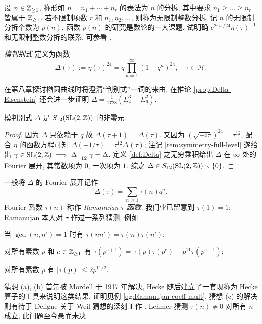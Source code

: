 \begin{exercise}
	设 $n \in \mathbb{Z}_{\geq 1}$, 称形如 $n = n_1 + \cdots + n_r$ 的表法为 $n$ 的分拆, 其中要求 $n_1 \geq \ldots \geq n_r$ 皆属于 $\mathbb{Z}_{\geq 1}$. 若不限制项数 $r$ 和 $n_1, n_2, \ldots$, 则称为无限制整数分拆, 记 $n$ 的无限制分拆个数为 $p(n)$. 函数 $p(n)$ 的研究是数论的一大课题. 试明确 $e^{2\pi i\tau/24} \eta(\tau)^{-1}$ 和无限制整数分拆的联系. 可参看 \cite[附录 A.4]{Ste17}.
\end{exercise}

\begin{definition}\label{def:Delta}  
	\emph{模判别式} 定义为函数
	\[ \Delta(\tau) := \eta(\tau)^{24} = q \prod_{n=1}^\infty (1-q^n)^{24}, \quad \tau \in \mathcal{H}. \]
\end{definition}
在第八章探讨椭圆曲线时将澄清``判别式''一词的来由. 在推论 \ref{prop:Delta-Eisenstein} 还会进一步证明 $\Delta = \frac{1}{1728}(E_4^3 - E_6^2)$.

\begin{proposition}
	模判别式 $\Delta$ 是 $S_{12}(\operatorname{SL}(2,\mathbb{Z}))$ 的非零元.
\end{proposition}
\begin{proof}
	因为 $\Delta$ 只依赖于 $q$ 故 $\Delta(\tau+1)=\Delta(\tau)$. 又因为 $(\sqrt{-i\tau})^{24} = \tau^{12}$, 配合 $\eta$ 的函数方程可知 $\Delta(-1/\tau) = \tau^{12} \Delta(\tau)$; 注记 \ref{rem:symmetry-full-level} 遂给出 $\gamma \in \operatorname{SL}(2,\mathbb{Z}) \implies \Delta \;\big|_{12} \; \gamma =\Delta$. 定义 \ref{def:Delta} 之无穷乘积给出 $\Delta$ 在 $\infty$ 处的 Fourier 展开, 其常数项为 $0$, 一次项为 $1$. 综之 $\Delta \in S_{12}(\operatorname{SL}(2,\mathbb{Z})) \smallsetminus \{0\}$.
\end{proof}

一般将 $\Delta$ 的 Fourier 展开记作  
\[ \Delta(\tau) = \sum_{n \geq 1} \tau(n) q^n .\]
Fourier 系数 $\tau(n)$ 称作 \emph{Ramanujan $\tau$ 函数}. 我们业已留意到 $\tau(1)=1$; Ramanujan 本人对 $\tau$ 作过一系列猜测, 例如
\begin{compactenum}[(a)]
	\item 当 $\gcd(n,n')=1$ 时有 $\tau(nn')=\tau(n)\tau(n')$;
	\item 对所有素数 $p$ 和 $e \in \mathbb{Z}_{\geq 1}$ 有 $\tau(p^{e+1}) = \tau(p)\tau(p^e) - p^{11}\tau(p^{e-1})$;
	\item 对所有素数 $p$ 有 $|\tau(p)| \leq 2p^{11/2}$.
\end{compactenum}
猜想 (a), (b) 首先被 Mordell 于 1917 年解决, Hecke 随后建立了一套现称为 Hecke 算子的工具来说明这类结果, 证明见例 \ref{eg:Ramanujan-coeff-mult}. 猜想 (c) 的解决则有待于 Deligne 关于 Weil 猜想的深刻工作 \cite{Del71}. Lehmer 猜测 $\tau(n) \neq 0$ 对所有 $n$ 成立, 此问题至今悬而未决.

